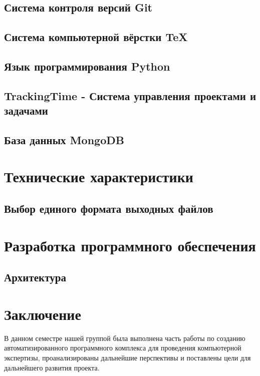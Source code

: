\subsection{Система контроля версий Git}

\subsection{Система компьютерной вёрстки \TeX}

\subsection{Язык программирования Python}

\subsection{TrackingTime - Система управления проектами и задачами}

\subsection{База данных MongoDB}


\section{Технические характеристики}

\subsection{Выбор единого формата выходных файлов}


\section{Разработка программного обеспечения}
\setcounter{figure}{0}
 
\subsection{Архитектура}


\newpage
\section*{Заключение}
В данном семестре нашей группой была выполнена часть работы по созданию автоматизированного программного комплекса для проведения компьютерной экспертизы, проанализированы дальнейшие перспективы и поставлены цели для дальнейшего развития проекта.
 
